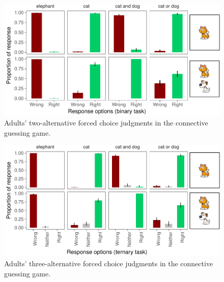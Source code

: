 \documentclass[floatsintext,man]{apa6}
\theoremstyle{definition}
\theoremstyle{definition}
\theoremstyle{definition}
\theoremstyle{remark}
\begin{document}
\begin{figure}[t]

{\centering \includegraphics{writeup_files/figure-latex/binaryPlot-1} 

}

\caption{Adults' two-alternative forced choice judgments in the connective guessing game.}\label{fig:binaryPlot}
\end{figure}

\begin{figure}[t]

{\centering \includegraphics{writeup_files/figure-latex/ternaryPlot-1} 

}

\caption{Adults' three-alternative forced choice judgments in the connective guessing game.}\label{fig:ternaryPlot}
\end{figure}
\end{document}
